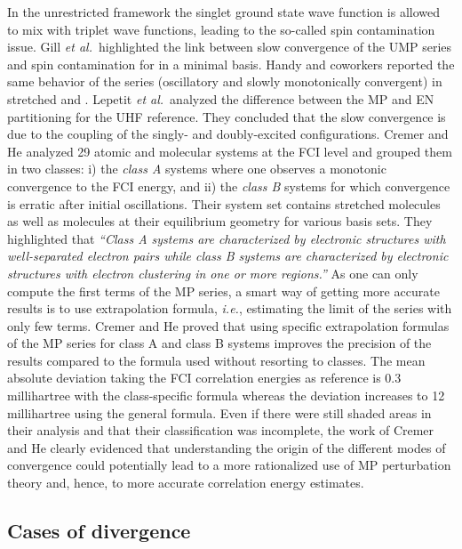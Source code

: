 \documentclass[aps,prb,reprint,noshowkeys,superscriptaddress]{revtex4-1}
\newcommand{\ie}{\textit{i.e.}}
\begin{document}
In the unrestricted framework the singlet ground state wave function is allowed to mix with triplet wave functions, leading to the so-called spin contamination issue. Gill \textit{et al.}~highlighted the link between slow convergence of the UMP series and spin contamination for  in a minimal basis. \cite{Gill_1988}
Handy and coworkers reported the same behavior of the series (oscillatory and slowly monotonically convergent) in stretched  and . \cite{Handy_1985} Lepetit \textit{et al.}~analyzed the difference between the MP and EN partitioning for the UHF reference. \cite{Lepetit_1988} 
They concluded that the slow convergence is due to the coupling of the singly- and doubly-excited configurations. 
Cremer and He analyzed 29 atomic and molecular systems at the FCI level \cite{Cremer_1996} and grouped them in two classes: i) the \textit{class A} systems where one observes a monotonic convergence to the FCI energy, and ii) the \textit{class B} systems for which convergence is erratic after initial oscillations. Their system set contains stretched molecules as well as molecules at their equilibrium geometry for various basis sets. They highlighted that \cite{Cremer_1996}
\textit{``Class A systems are characterized by electronic structures with well-separated electron pairs while class B systems are characterized by electronic structures with electron clustering in one or more regions.''}
As one can only compute the first terms of the MP series, a smart way of getting more accurate results is to use extrapolation formula, \ie, estimating the limit of the series with only few terms. 
Cremer and He proved that using specific extrapolation formulas of the MP series for class A and class B systems improves the precision of the results compared to the formula used without resorting to classes. The mean absolute deviation taking the FCI correlation energies as reference is $0.3$ millihartree with the class-specific formula whereas the deviation increases to 12 millihartree using the general formula.  
Even if there were still shaded areas in their analysis and that their classification was incomplete, the work of Cremer and He clearly evidenced that understanding the origin of the different modes of convergence could potentially lead to a more rationalized use of MP perturbation theory and, hence, to more accurate correlation energy estimates.

\subsection{Cases of divergence}
\end{document}
